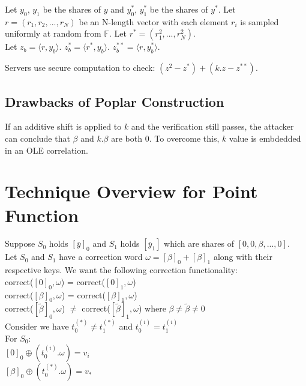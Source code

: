 Let $y_0$, $y_1$ be the shares of $y$ and $y^*_0$, $y^*_1$ be the shares of $y^*$. Let $r = (r_1, r_2, ..., r_N)$ be an N-length vector with each element $r_i$ is sampled uniformly at random from $\mathbb{F}$. Let $r^* = (r_1^2, ..., r_N^2)$. \\

Let $z_b = \langle r, y_b \rangle$. $z_b^* = \langle r^*, y_b \rangle$. $z_b^{**} = \langle r, y_b^* \rangle$.

Servers use secure computation to check: $(z^2 - z^*) + (k.z - z^{**})$.

\subsection{Drawbacks of Poplar Construction}

If an additive shift is applied to $k$ and the verification still passes, the attacker can conclude that $\beta$ and $k.\beta$ are both 0. To overcome this, $k$ value is embdedded in an OLE correlation.

\section{Technique Overview for Point Function}

Suppose $S_0$ holds $[\bar{y}]_0$ and $S_1$ holds $[\bar{y}_1]$ which are shares of $[0, 0, \beta, ..., 0]$. \\

Let $S_0$ and $S_1$ have a correction word $\omega = [\beta]_0 + [\beta]_1$ along with their respective keys. We want the following correction functionality:\\

\noindent correct($[0]_0, \omega$) = correct($[0]_1, \omega$) \\
correct($[\beta]_0, \omega$) = correct($[\beta]_1, \omega$) \\
correct($[\tilde{\beta}]_0, \omega$) $\neq$ correct($[\tilde{\beta}]_1, \omega$) where $\beta \neq \tilde{\beta} \neq 0$ \\

Consider we have $t_0^{(*)} \neq t_1^{(*)}$ and $t_0^{(i)} = t_1^{(i)}$ \\

For $S_0$: \\
$[0]_0 \oplus (t_0^{(i)}.\omega) = v_i$ \\
$[\beta]_0 \oplus (t_0^{(*)}.\omega) = v_*$ \\

